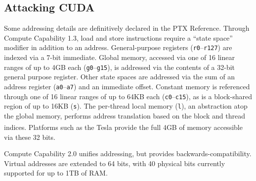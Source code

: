 \documentclass[letterpaper,10pt]{article}
\begin{document}
\begin{multicols}{2}
\section{Attacking CUDA}
Some addressing details are definitively declared in the PTX Reference.
Through Compute Capability 1.3, load and store instructions require a ``state space''
modifier in addition to an address. General-purpose registers (\texttt{r0}--\texttt{r127}) are
indexed via a 7-bit immediate. Global memory, accessed via one of 16 linear ranges
of up to 4GB each (\texttt{g0}--\texttt{g15}), is addressed via the
contents of a 32-bit general purpose register. Other state spaces are addressed
via the sum of an address register (\texttt{a0}--\texttt{a7}) and an immediate
offset. Constant memory is referenced through one of 16 linear ranges of up to
64KB each (\texttt{c0}--\texttt{c15}), as is a block-shared region of up to 16KB
(\texttt{s}). The per-thread local memory (\texttt{l}), an abstraction atop the
global memory, performs address translation based on the block and thread indices.
Platforms such as the Tesla\textsuperscript{\texttrademark} provide the full 
4GB of memory accessible via these 32 bits.

Compute Capability 2.0 unifies addressing, but provides backwards-compatibility.
Virtual addresses are extended to 64 bits, with 40 physical bits currently
supported for up to 1TB of RAM.

\end{multicols}
\end{document}
